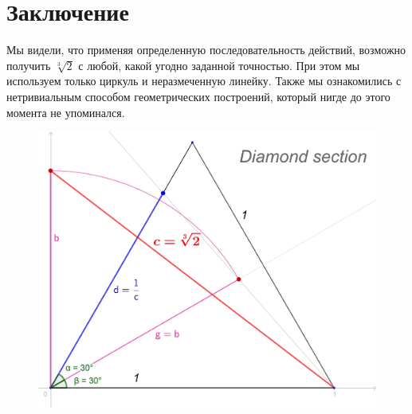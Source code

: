 \documentclass[12pt, letterpaper, oneside]{report}
\begin{document}
\newpage
 
\section{Заключение}

 
Мы видели, что применяя определенную последовательность действий, возможно получить $\sqrt[3]{2}$ с любой, какой угодно заданной точностью. При этом мы используем только циркуль и неразмеченную линейку. Также мы ознакомились с  нетривиальным способом геометрических построений, который нигде до этого момента не упоминался.\\



\begin{figure}[h]
	\centering
	\includegraphics[width=0.6\linewidth]{images/ds_def.jpg}
	
	\label{fig:Diamond Section}
\end{figure}

\newpage
\end{document}
